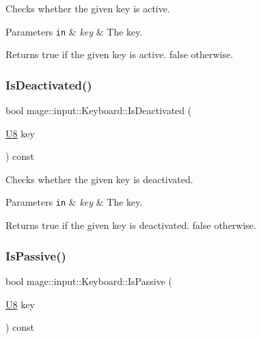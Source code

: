 Checks whether the given key is active.


\begin{DoxyParams}[1]{Parameters}
\mbox{\tt in}  & {\em key} & The key. \\
\hline
\end{DoxyParams}
\begin{DoxyReturn}{Returns}
{\ttfamily true} if the given key is active. {\ttfamily false} otherwise. 
\end{DoxyReturn}
\mbox{\label{classmage_1_1input_1_1_keyboard_ac3a66b65cabf50a07ba78847e5860ece}} 
\subsubsection{\texorpdfstring{Is\+Deactivated()}{IsDeactivated()}}
{\footnotesize\ttfamily bool mage\+::input\+::\+Keyboard\+::\+Is\+Deactivated (\begin{DoxyParamCaption}\item[{\mbox{\hyperlink{namespacemage_a30677c03d683c4c35630c25f6ff3fb7f}{U8}}}]{key }\end{DoxyParamCaption}) const\hspace{0.3cm}{\ttfamily [noexcept]}}

Checks whether the given key is deactivated.


\begin{DoxyParams}[1]{Parameters}
\mbox{\tt in}  & {\em key} & The key. \\
\hline
\end{DoxyParams}
\begin{DoxyReturn}{Returns}
{\ttfamily true} if the given key is deactivated. {\ttfamily false} otherwise. 
\end{DoxyReturn}
\mbox{\label{classmage_1_1input_1_1_keyboard_a4bbd5f7db6d2cb7123e74edd05363dba}} 
\subsubsection{\texorpdfstring{Is\+Passive()}{IsPassive()}}
{\footnotesize\ttfamily bool mage\+::input\+::\+Keyboard\+::\+Is\+Passive (\begin{DoxyParamCaption}\item[{\mbox{\hyperlink{namespacemage_a30677c03d683c4c35630c25f6ff3fb7f}{U8}}}]{key }\end{DoxyParamCaption}) const\hspace{0.3cm}{\ttfamily [noexcept]}}

